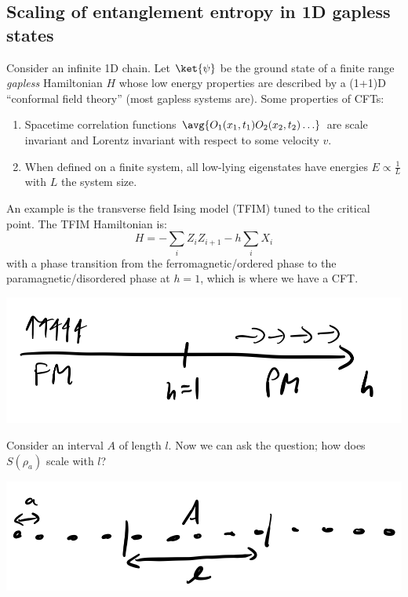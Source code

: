 \subsection{Scaling of entanglement entropy in 1D gapless states}
Consider an infinite 1D chain. Let $\ket{\psi}$ be the ground state of a finite range \emph{gapless} Hamiltonian $H$ whose low energy properties are described by a (1+1)D ``conformal field theory'' (most gapless systems are). Some properties of CFTs:
\begin{enumerate}
    \item Spacetime correlation functions $\avg{O_1(x_1, t_1)O_2(x_2, t_2)\ldots}$ are scale invariant and Lorentz invariant with respect to some velocity $v$.
    \item When defined on a finite system, all low-lying eigenstates have energies $E \propto \frac{1}{L}$ with $L$ the system size.
\end{enumerate}
An example is the transverse field Ising model (TFIM) tuned to the critical point. The TFIM Hamiltonian is:
\begin{equation}
    H = -\sum_i Z_i Z_{i+1} - h\sum_i X_i
\end{equation}
with a phase transition from the ferromagnetic/ordered phase to the paramagnetic/disordered phase at $h = 1$, which is where we have a CFT.

\begin{center}
    \includegraphics[scale=0.35]{Lectures/Images/lec16-TFIMphases.png}
\end{center}

Consider an interval $A$ of length $l$. Now we can ask the question; how does $S(\rho_a)$ scale with $l$?

\begin{center}
    \includegraphics[scale=0.35]{Lectures/Images/lec16-CFT.png}
\end{center}

